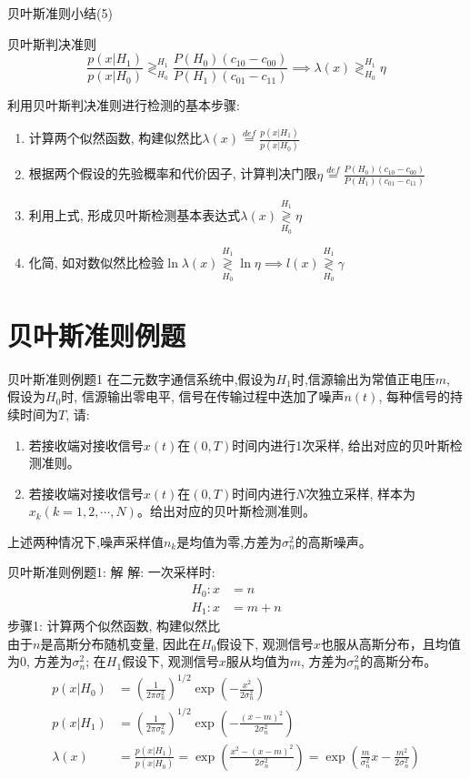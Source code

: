 \begin{frame}{贝叶斯准则小结(5)}
\begin{block}{贝叶斯判决准则}
\[ \frac{p(x|H_1)}{p(x|H_0)}\mathop{\gtrless}_{H_0}^{H_1}\frac{P(H_0)(c_{10}-c_{00})}{P(H_1)(c_{01}-c_{11})} \implies \lambda(x)\mathop{\gtrless}_{H_0}^{H_1}\eta \]
\end{block}
利用贝叶斯判决准则进行检测的基本步骤:
\begin{enumerate}
\item 计算两个似然函数, 构建似然比$\lambda(x)\mathop{=}\limits^{def}\frac{p(x|H_1)}{p(x|H_0)}$
\item 根据两个假设的先验概率和代价因子, 计算判决门限$\eta\mathop{=}\limits^{def}\frac{P(H_0)(c_{10}-c_{00})}{P(H_1)(c_{01}-c_{11})}$
\item 利用上式, 形成贝叶斯检测基本表达式$\lambda(x)\mathop{\gtrless}\limits_{H_0}^{H_1}\eta$
\item 化简, 如对数似然比检验$\ln\lambda(x)\mathop{\gtrless}\limits_{H_0}^{H_1}\ln\eta\implies l(x)\mathop{\gtrless}\limits_{H_0}^{H_1}\gamma$
\end{enumerate}
\end{frame}

\section{贝叶斯准则例题}

\begin{frame}{贝叶斯准则例题1}
在二元数字通信系统中,假设为$H_1$时,信源输出为常值正电压$m$, 假设为$H_0$时, 信源输出零电平, 信号在传输过程中迭加了噪声$n(t)$, 每种信号的持续时间为$T$, 请:
\begin{enumerate}
	\item 若接收端对接收信号$x(t)$在$(0,T)$时间内进行1次采样, 给出对应的贝叶斯检测准则。
	\item 若接收端对接收信号$x(t)$在$(0,T)$时间内进行$N$次独立采样, 样本为$x_k(k=1,2,\cdots,N)$。给出对应的贝叶斯检测准则。
\end{enumerate}
上述两种情况下,噪声采样值$n_k$是均值为零,方差为$\sigma_n^2$的高斯噪声。
\end{frame}

\begin{frame}[shrink]{贝叶斯准则例题1: 解}
解: 一次采样时:
\begin{align*}
H_0: x&=n\\
H_1: x&=m+n
\end{align*}
步骤1: 计算两个似然函数, 构建似然比\\
由于$n$是高斯分布随机变量, 因此在$H_0$假设下, 观测信号$x$也服从高斯分布，且均值为0, 方差为$\sigma_n^2$; 在$H_1$假设下, 观测信号$x$服从均值为$m$, 方差为$\sigma_n^2$的高斯分布。
\begin{align*}
p(x|H_0)&=\left(\frac{1}{2\pi\sigma_n^2}\right)^{1/2}\exp\left(-\frac{x^2}{2\sigma_n^2}\right)\\
p(x|H_1)&=\left(\frac{1}{2\pi\sigma_n^2}\right)^{1/2}\exp\left(-\frac{(x-m)^2}{2\sigma_n^2}\right)\\
\lambda(x)&=\frac{p(x|H_1)}{p(x|H_0)}=\exp\left(\frac{x^2-(x-m)^2}{2\sigma_n^2}\right)=\exp\left(\frac{m}{\sigma_n^2}x-\frac{m^2}{2\sigma_n^2}\right)
\end{align*} 
\end{frame}

